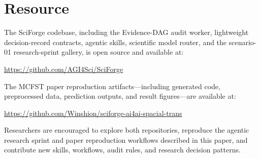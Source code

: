 \documentclass[sn-basic,Numbered,pdflatex]{sn-jnl}
\begin{document}
\section{Resource}

The SciForge codebase, including the Evidence-DAG audit worker, lightweight decision-record contracts, agentic skills, scientific model router, and the scenario-01 research-sprint gallery, is open source and available at:

\vspace{4pt}
\centering
\url{https://github.com/AGI4Sci/SciForge}
\vspace{8pt}

\noindent The MCFST paper reproduction artifacts---including generated code, preprocessed data, prediction outputs, and result figures---are available at:

\vspace{4pt}
\centering
\url{https://github.com/Winshion/sciforge-ai4ai-spacial-trans}
\vspace{8pt}

\noindent Researchers are encouraged to explore both repositories, reproduce the agentic research sprint and paper reproduction workflows described in this paper, and contribute new skills, workflows, audit rules, and research decision patterns.


\end{document}
